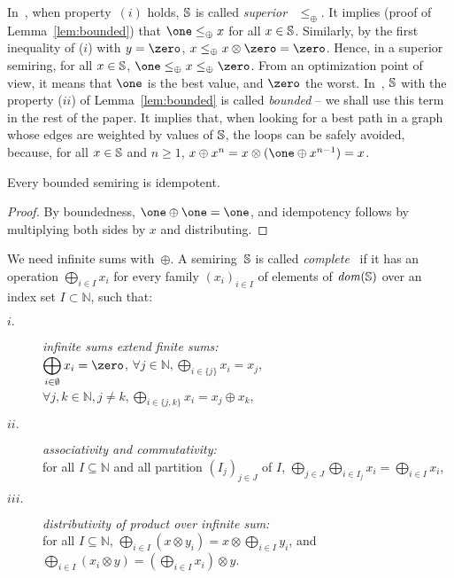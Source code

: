 In~\cite{Huang08advanceddynamic}, when  property~$(i)$ holds,
$\mathbb{S}$ is called \emph{superior} \wrt~$\leq_\oplus$.
It implies (proof of Lemma~\ref{lem:bounded})
that
$\one \leq_\oplus x$ for all $x \in \mathbb{S}$.
Similarly, by the first inequality of ($i$) with $y = \zero$,
$x \leq_\oplus x \otimes \zero = \zero$.
%
Hence, in a superior semiring,
for all $x \in \mathbb{S}$, $\one \leq_\oplus x \leq_\oplus \zero$.
%
From an optimization point of view,
it means that $\one$ is the best value, and $\zero$ the worst.
%
In~\cite{Mohri02semiring},
$\mathbb{S}$ with the property ($ii$) of Lemma~\ref{lem:bounded}
is called \emph{bounded} -- we shall use this term in the rest of the paper.
It implies that, when looking for a best path in a graph whose edges
are weighted by values of $\mathbb{S}$, the loops can be safely avoided,
because, for all $x \in \mathbb{S}$ and $n \geq 1$,
 $x \oplus x^n = x \otimes (\one \oplus x^{n-1}) = x$.


\begin{lemma}\label{lem:idempotent}
Every bounded semiring is idempotent.
\end{lemma}
\begin{proof}
By boundedness, $\one \oplus \one = \one$,
and idempotency follows by multiplying
both sides by $x$ and distributing.
\end{proof}

\noindent
We  need infinite sums with~$\oplus$.
A semiring~$\mathbb{S}$ is called \emph{complete}~\cite{Droste09handbook}
if it has an %
operation $\bigoplus_{i \in I} x_i$
for every family
$(x_i)_{i \in I}$ %
of elements of $\mathit{dom}(\mathbb{S})$ over an index set $I \subset \mathbb{N}$, such that:
\begin{description}
\item[$i.$]
\emph{infinite sums extend finite sums:}\\
$\displaystyle\bigoplus_{i \in \emptyset} x_i = \zero$,\quad
      $\forall j\in \mathbb{N}, \displaystyle\bigoplus_{i \in \{ j \}} x_i = x_j$,
      $\forall j, k\in \mathbb{N}, j\neq k,
      \displaystyle\bigoplus_{i \in \{ j, k \}} x_i = x_j \oplus x_k$,
%
\item[$ii.$]
\emph{associativity and commutativity:}\\
for all $I \subseteq \mathbb{N}$
and all partition $(I_{j})_{j \in J}$ of $I$, %
\(
\displaystyle
\bigoplus_{j \in J}\bigoplus_{i \in I_j} x_i =
\bigoplus_{i \in I} x_i
\),
%
\item[$iii.$]
\emph{distributivity of product over infinite sum:}\\
for all $I \subseteq \mathbb{N}$,
\(
\displaystyle
\bigoplus_{i \in I} (x \otimes y_i) = x \otimes \bigoplus_{i\in I} y_i\), and
\(
\displaystyle
\bigoplus_{i \in I} (x_i \otimes y) = (\bigoplus_{i \in I} x_i ) \otimes y\).
\end{description}



